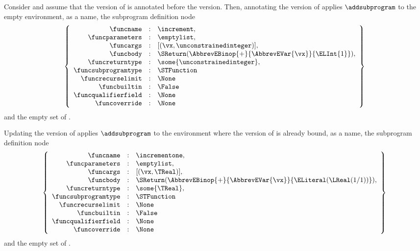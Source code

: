 
Consider 
and assume that the \integertypeterm{} version of \increment{} is annotated
before the \realtypeterm{} version.
Then, annotating the \integertypeterm{} version of \increment{} applies
$\addsubprogram$ to the empty environment, \increment{} as a name,
the subprogram definition node
\[
\left\{
\begin{array}{rcl}
\funcname &:& \increment, \\
\funcparameters &:& \emptylist,\\
\funcargs &:& [(\vx, \unconstrainedinteger)],\\
\funcbody &:& \SReturn(\AbbrevEBinop{+}{\AbbrevEVar{\vx}}{\ELInt{1}}),\\
\funcreturntype &:& \some{\unconstrainedinteger},\\
\funcsubprogramtype &:& \STFunction\\
\funcrecurselimit    &:& \None\\
\funcbuiltin &:& \False\\
\funcqualifierfield &:& \None\\
\funcoverride &:& \None\\
\end{array}
\right\}
\]
and the empty set of \sideeffectdescriptorsterm.

Updating the \realtypeterm{} version of \increment{}
applies $\addsubprogram$ to the environment where the \integertypeterm{} version
of \increment{} is already bound, \incrementone{} as a name,
the subprogram definition node
\[
\left\{
\begin{array}{rcl}
\funcname &:& \incrementone, \\
\funcparameters &:& \emptylist,\\
\funcargs &:& [(\vx, \TReal)],\\
\funcbody &:& \SReturn(\AbbrevEBinop{+}{\AbbrevEVar{\vx}}{\ELiteral(\LReal(1/1))}),\\
\funcreturntype &:& \some{\TReal},\\
\funcsubprogramtype &:& \STFunction\\
\funcrecurselimit    &:& \None\\
\funcbuiltin &:& \False\\
\funcqualifierfield &:& \None\\
\funcoverride &:& \None\\
\end{array}
\right\}
\]
and the empty set of \sideeffectdescriptorsterm.


